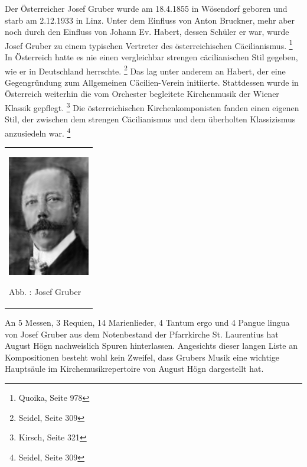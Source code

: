 \documentclass[a4paper]{article}
\newcounter{Abb}
\renewcommand\theAbb{\arabic{Abb}}
\begin{document}
Der Österreicher Josef Gruber wurde am 18.4.1855 in Wösendorf geboren
und starb am 2.12.1933 in Linz. Unter dem Einfluss von Anton Bruckner,
mehr aber noch durch den Einfluss von Johann Ev. Habert, dessen Schüler
er war, wurde Josef Gruber zu einem typischen Vertreter des
österreichischen Cäcilianismus. \footnote{Quoika, Seite 978} In
Österreich hatte es nie einen vergleichbar strengen cäcilianischen Stil
gegeben, wie er in Deutschland herrschte. \footnote{Seidel, Seite 309}
Das lag unter anderem an Habert, der eine Gegengründung zum Allgemeinen
Cäcilien-Verein initiierte. Stattdessen wurde in Österreich weiterhin
die vom Orchester begleitete Kirchenmusik der Wiener Klassik
gepflegt. \footnote{Kirsch, Seite 321} Die österreichischen
Kirchenkomponisten fanden einen eigenen Stil, der zwischen dem strengen
Cäcilianismus und dem überholten Klassizismus anzusiedeln
war. \footnote{Seidel, Seite 309}

\begin{center}
\begin{minipage}{3.953cm}
\begin{flushleft}
\tablefirsthead{}
\tablehead{}
\tabletail{}
\tablelasttail{}
\begin{supertabular}{m{3.753cm}}

\includegraphics[width=3.57cm,height=5.276cm]{pictures/zulassungsarbeit-img093.jpg}

Abb. \stepcounter{Abb}{\theAbb}: Josef Gruber\\
\end{supertabular}
\end{flushleft}
\end{minipage}
\end{center}
An 5 Messen, 3 Requien, 14 Marienlieder, 4 Tantum ergo und 4 Pangue
lingua von Josef Gruber aus dem Notenbestand der Pfarrkirche St.
Laurentius hat August Högn nachweislich Spuren hinterlassen. Angesichts
dieser langen Liste an Kompositionen besteht wohl kein Zweifel, dass
Grubers Musik eine wichtige Hauptsäule im Kirchemusikrepertoire von
August Högn dargestellt hat.
\end{document}
